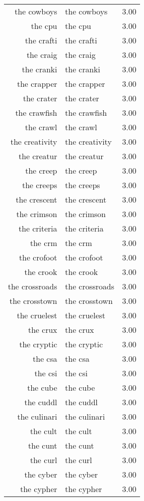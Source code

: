 \begin{table}[ht]
\begin{tabular}{rlr}
  the cowboys & the cowboys & 3.00 \\ 
  the cpu & the cpu & 3.00 \\ 
  the crafti & the crafti & 3.00 \\ 
  the craig & the craig & 3.00 \\ 
  the cranki & the cranki & 3.00 \\ 
  the crapper & the crapper & 3.00 \\ 
  the crater & the crater & 3.00 \\ 
  the crawfish & the crawfish & 3.00 \\ 
  the crawl & the crawl & 3.00 \\ 
  the creativity & the creativity & 3.00 \\ 
  the creatur & the creatur & 3.00 \\ 
  the creep & the creep & 3.00 \\ 
  the creeps & the creeps & 3.00 \\ 
  the crescent & the crescent & 3.00 \\ 
  the crimson & the crimson & 3.00 \\ 
  the criteria & the criteria & 3.00 \\ 
  the crm & the crm & 3.00 \\ 
  the crofoot & the crofoot & 3.00 \\ 
  the crook & the crook & 3.00 \\ 
  the crossroads & the crossroads & 3.00 \\ 
  the crosstown & the crosstown & 3.00 \\ 
  the cruelest & the cruelest & 3.00 \\ 
  the crux & the crux & 3.00 \\ 
  the cryptic & the cryptic & 3.00 \\ 
  the csa & the csa & 3.00 \\ 
  the csi & the csi & 3.00 \\ 
  the cube & the cube & 3.00 \\ 
  the cuddl & the cuddl & 3.00 \\ 
  the culinari & the culinari & 3.00 \\ 
  the cult & the cult & 3.00 \\ 
  the cunt & the cunt & 3.00 \\ 
  the curl & the curl & 3.00 \\ 
  the cyber & the cyber & 3.00 \\ 
  the cypher & the cypher & 3.00 \\ 

\end{tabular}
\end{table}
